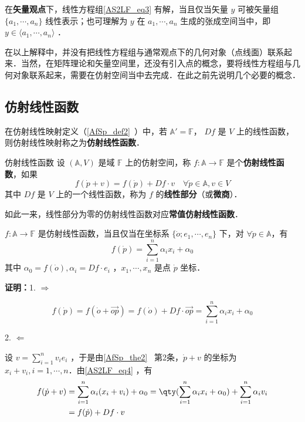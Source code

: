 在\textbf{矢量观点}下，线性方程组\autoref{AS2LF_eq3} 有解，当且仅当矢量 $y$ 可被矢量组 $\{a_1,\cdots,a_n\}$ 线性表示；也可理解为 $y$ 在 $a_1,\cdots,a_n$ 生成的张成空间当中，即$y\in\langle a_1,\cdots,a_n\rangle$ ．

在以上解释中，并没有把线性方程组与通常观点下的几何对象（点线面）联系起来．当然，在矩阵理论和矢量空间里，还没有引入点的概念，要将线性方程组与几何对象联系起来，需要在仿射空间当中去完成．在此之前先说明几个必要的概念．
\subsection{仿射线性函数}
在仿射线性映射定义（\autoref{AfSp_def2}~）中，若 $\mathbb A'=\mathbb F$， $Df$ 是 $V$ 上的线性函数，则仿射线性映射称之为\textbf{仿射线性函数}．
\begin{definition}{仿射线性函数}
设 $(\mathbb A,V)$ 是域 $\mathbb {F}$ 上的仿射空间，称 $f:\mathbb A\rightarrow \mathbb F$ 是个\textbf{仿射线性函数}，如果
\begin{equation}
f(\dot p+v)=f(\dot p)+Df\cdot v\quad\forall \dot p\in\mathbb A,v\in V
\end{equation}
其中 $Df$ 是 $V$ 上的一个线性函数，称为 $f$ 的\textbf{线性部分}（或\textbf{微商}）．
\end{definition}
如此一来，线性部分为零的仿射线性函数对应\textbf{常值仿射线性函数}．
\begin{theorem}{}\label{AS2LF_the1}
 $f:\mathbb A\rightarrow \mathbb F$ 是仿射线性函数，当且仅当在坐标系 $\{\dot o;e_1,\cdots,e_n\}$ 下，对 $\forall \dot p\in \mathbb A$，有
 \begin{equation}\label{AS2LF_eq4}
 f(\dot p)=\sum_{i=1}^n\alpha_ix_i+\alpha_0
 \end{equation}
 其中 $\alpha_0=f(\dot o),\alpha_i=Df\cdot e_i$ ，$x_1,\cdots,x_n$ 是点 $\dot p$ 坐标．
\end{theorem}
\textbf{证明：}1. $\Rightarrow$

\begin{equation}
f(\dot p)=f(\dot o+\vec{op})=f(\dot o)+Df\cdot \vec{op}=\sum_{i=1}^n \alpha_i x_i+\alpha_0
\end{equation}

2. $\Leftarrow$

设 $v=\sum\limits_{i=1}^n v_ie_i$ ，于是由\autoref{AfSp_the2}~ 第2条，$\dot p+v$ 的坐标为 $x_i+v_i,i=1,\cdots ,n$．由\autoref{AS2LF_eq4} ，有
\begin{equation}
\begin{aligned}
f(\dot p+v)&=\sum_{i=1}^n\alpha_i(x_i+v_i)+\alpha_0=\qty(\sum_{i=1}^n\alpha_i x_i+\alpha_0)+\sum_{i=1}^n\alpha_i v_i\\
&=f(\dot p)+Df\cdot v
\end{aligned}
\end{equation}

